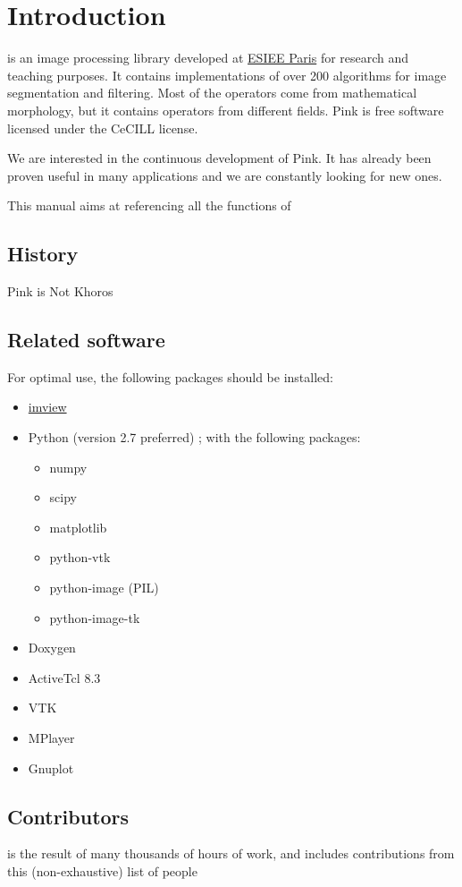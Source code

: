 \chapter{Introduction}\label{chap:introduction}

\Pink is an image processing library developed at \href {http://www.esiee.fr}{ESIEE
  Paris} for research and teaching purposes. It
contains implementations of over 200 algorithms for image segmentation and
filtering. Most of the operators come from mathematical morphology, but it
contains operators from different fields. Pink is free software licensed under
the CeCILL license.

We are interested in the continuous development of Pink. It has already been
proven useful in many applications and we are constantly looking for new ones.

This manual aims at referencing all the functions of 

\section*{History}
Pink is Not Khoros

\section*{Related software}
For optimal use, the following packages should be installed: 

\begin{itemize}
\item \href {http://www.sf.net/projects/imview}{imview}
\item Python (version 2.7 preferred) ; with the following packages:
  \begin{itemize}
  \item numpy
  \item scipy
  \item matplotlib
  \item python-vtk
  \item python-image (PIL)
 \item python-image-tk
  \end{itemize}
\item Doxygen
\item ActiveTcl 8.3
\item VTK
\item MPlayer
\item Gnuplot
\end{itemize}

\section*{Contributors}
\Pink is the result of many thousands of hours of work, and includes
contributions from this (non-exhaustive) list of people

